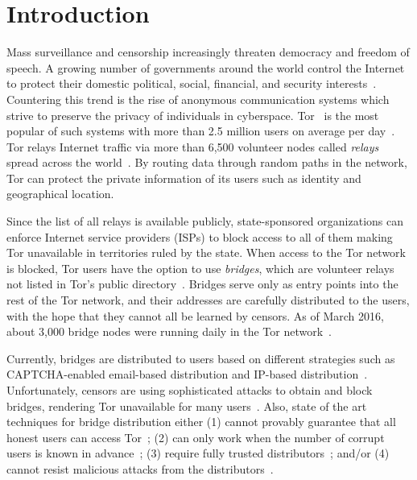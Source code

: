 \documentclass[USenglish,oneside,twocolumn]{article}
\begin{document}
\section{Introduction}
Mass surveillance and censorship increasingly threaten democracy and freedom of speech. A growing number of governments around the world control the Internet to protect their domestic political, social, financial, and security interests~\cite{Turner:2016:Surveillance,Rushe:2012:Censorship}. Countering this trend is the rise of anonymous communication systems which strive to preserve the privacy of individuals in cyberspace. Tor~\cite{dingledine:2004} is the most popular of such systems with more than 2.5 million users on average per day~\cite{Tor:Users}. Tor relays Internet traffic via more than 6,500 volunteer nodes called \emph{relays} spread across the world~\cite{Tor:Relays}. By routing data through random paths in the network, Tor can protect the private information of its users such as identity and geographical location.


Since the list of all relays is available publicly, state-sponsored organizations can enforce Internet service providers (ISPs) to block access to all of them making Tor unavailable in territories ruled by the state. 
When access to the Tor network is blocked, Tor users have the option to use \emph{bridges}, which are volunteer relays not listed in Tor's public directory~\cite{Dingledine06designof}. Bridges serve only as entry points into the rest of the Tor network, and their addresses are carefully distributed to the users, with the hope that they cannot all be learned by censors. 
As of March 2016, about 3,000 bridge nodes were running daily in the Tor network~\cite{Tor:Bridges}.

Currently, bridges are distributed to users based on different strategies such as CAPTCHA-enabled email-based distribution and IP-based distribution~\cite{Dingledine06designof}. Unfortunately, censors are using sophisticated attacks to obtain
and block bridges, rendering Tor unavailable for many users~\cite{Dingledine:Bridges:2011,Ling:2012:infocom,BridgeBlockingChina:2012}.
Also, state of the art techniques for bridge distribution either (1) cannot provably guarantee that all honest users can access Tor~\cite{WangLBH:rBridge:13,McCoy:FC:2011,Sovran:2008:PSN}; (2) can only work when the number of corrupt users is known in advance~\cite{Mahdian:2010}; (3) require fully trusted distributors~\cite{McCoy:FC:2011,Mahdian:2010,Sovran:2008:PSN}; and/or (4) cannot resist malicious attacks from the distributors~\cite{WangLBH:rBridge:13,McCoy:FC:2011,Mahdian:2010,Sovran:2008:PSN}.
\end{document}
